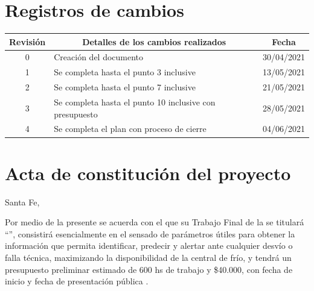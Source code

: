 \documentclass[
11pt, %
]{charter}
\begin{document}
\maketitle
\thispagestyle{empty}
\pagebreak


\thispagestyle{empty}
{\setlength{\parskip}{0pt}
\tableofcontents{}
}
\pagebreak


\section{Registros de cambios}
\label{sec:registro}


\begin{table}[ht]
\label{tab:registro}
\centering
\begin{tabularx}{\linewidth}{@{}|c|X|c|@{}}
\hline
\rowcolor[HTML]{C0C0C0} 
Revisión & \multicolumn{1}{c|}{\cellcolor[HTML]{C0C0C0}Detalles de los cambios realizados} & Fecha      \\ \hline
0      & Creación del documento                                 & 30/04/2021 \\ \hline
1      & Se completa hasta el punto 3 inclusive                 & 13/05/2021 \\ \hline
2      & Se completa hasta el punto 7 inclusive                 & 21/05/2021 \\ \hline
3      & Se completa hasta el punto 10 inclusive con presupuesto               & 28/05/2021 \\ \hline
4      & Se completa el plan con proceso de cierre	                          & 04/06/2021 \\ \hline
\end{tabularx}
\end{table}

\pagebreak

\section{Acta de constitución del proyecto}
\label{sec:acta}

\begin{flushright}
Santa Fe, \fechaInicioName
\end{flushright}

\vspace{2cm}

Por medio de la presente se acuerda con el \authorname\hspace{1px} que su Trabajo Final de la \degreename\hspace{1px} se titulará ``\ttitle'', consistirá esencialmente en el sensado de parámetros útiles para obtener la información que permita identificar, predecir y alertar ante cualquier desvío o falla técnica, maximizando la disponibilidad de la central de frío, y tendrá un presupuesto preliminar estimado de 600 hs de trabajo y {\$40.000}, con fecha de inicio \fechaInicioName\hspace{1px} y fecha de presentación pública \fechaFinalName.
\end{document}
